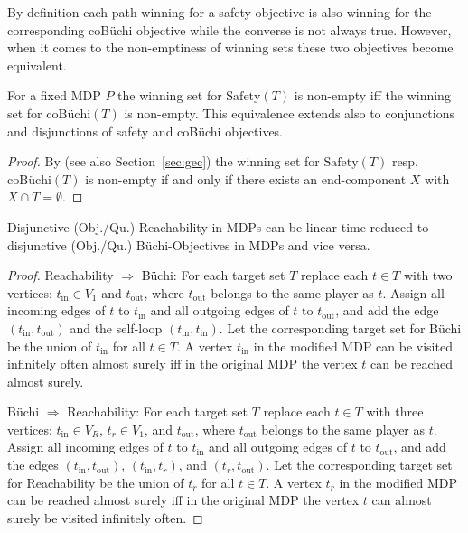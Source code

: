 \documentclass[11pt,letterpaper]{article}
\newcommand{\lu}{\textup{(}}
\newcommand{\ru}{\textup{)}\xspace}
\newcommand{\upbr}[1]{\lu #1\ru}
\newcommand{\objsty}[2]{\textrm{#1}\left(#2\right)}
\newcommand{\mdp}{P\xspace}
\newcommand{\vo}{V_1\xspace}
\newcommand{\vr}{V_R\xspace}
\newcommand{\target}{T\xspace}
\newcommand{\ec}{X\xspace}
\begin{document}
{By definition each path winning for a safety objective 
is also winning
for the corresponding coBüchi objective while the converse is not always true.
However, when it comes to the non-emptiness of winning sets these two objectives become equivalent.

\begin{observation}\label{obs:nonempty_safety_coBuchi}
	For a fixed MDP $\mdp$ the winning set for $\objsty{Safety}{\target}$ is non-empty
	iff the winning set for $\objsty{coB{\"u}chi}{\target}$ is non-empty.
	This equivalence extends also to conjunctions and disjunctions of safety and coBüchi objectives.
\end{observation}
\begin{proof}
	By \cite[p.~891]{CourcoubetisY95} (see also Section~\ref{sec:gec})
	the winning set for $\objsty{Safety}{\target}$ resp.\ $\objsty{coB{\"u}chi}{\target}$
	is non-empty if and only if there exists an end-component $\ec$ with $\ec \cap \target = \emptyset$.
\end{proof}

\begin{observation}\label{obs:Reachability_Buchi}
	Disjunctive \upbr{Obj./Qu.} Reachability in MDPs can be linear time reduced to 
	disjunctive \upbr{Obj./Qu.} Büchi-Objectives in MDPs and vice versa.
\end{observation}
\begin{proof}
	Reachability $\Rightarrow$ Büchi: For each target set $\target$ 
	replace each $t \in \target$ with two vertices: $t_\text{in} \in \vo$ and 
	$t_\text{out}$, where $t_\text{out}$ belongs to the same player as $t$.
	Assign all incoming edges of $t$ to $t_\text{in}$
	and all outgoing edges of $t$ to $t_\text{out}$, and add the edge $(t_\text{in},
	t_\text{out})$ and the self-loop $(t_\text{in}, t_\text{in})$. Let the 
	corresponding target set for Büchi be the union of $t_\text{in}$ for all 
	$t \in \target$. A vertex $t_\text{in}$ in the modified MDP can be visited 
	infinitely often  almost surely iff in the original MDP the vertex $t$ can be
	reached almost surely.
	
	Büchi $\Rightarrow$ Reachability: For each target set $\target$ 
	replace each $t \in \target$ with three vertices: $t_\text{in} \in \vr$,
	$t_r \in \vo$, and $t_\text{out}$, where $t_\text{out}$ belongs to the 
	same player as $t$. Assign all incoming edges of $t$ to $t_\text{in}$
	and all outgoing edges of $t$ to $t_\text{out}$, and add the edges 
	$(t_\text{in}, t_\text{out})$, $(t_\text{in}, t_r)$, and $(t_r, t_\text{out})$.
	Let the corresponding target set for Reachability be the union of $t_r$ for all 
	$t \in \target$. A vertex $t_r$ in the modified MDP can be reached almost 
	surely iff in the original MDP the vertex $t$ can almost surely
	be visited infinitely often.
\end{proof}

}
\end{document}
